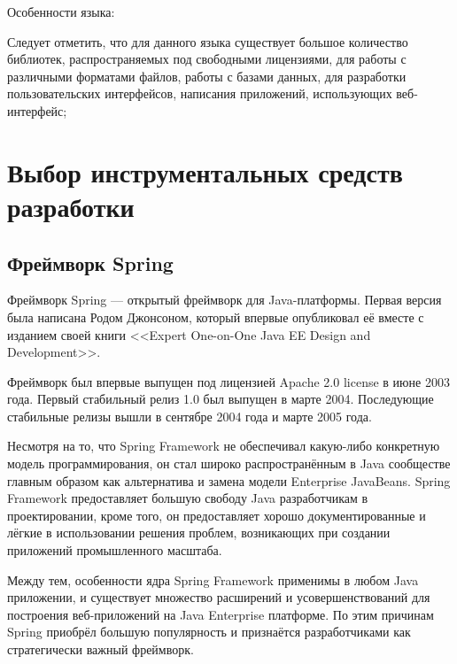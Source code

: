 \documentclass[14pt,a4paper]{reportmod}
\begin{document}
Особенности языка:
\begin{gostitemize}
\end{gostitemize}


Следует отметить, что для данного языка существует большое количество библиотек, распространяемых под свободными лицензиями, для работы с различными форматами файлов, работы с базами данных, для разработки пользовательских интерфейсов, написания приложений, использующих веб-интерфейс;

\section{Выбор инструментальных средств разработки}

\subsection{Фреймворк Spring}
Фреймворк Spring --- открытый фреймворк для Java-платформы. Первая версия была написана Родом Джонсоном, который впервые опубликовал её вместе с изданием своей книги <<Expert One-on-One Java EE Design and Development>>.


Фреймворк был впервые выпущен под лицензией Apache 2.0 license в июне 2003 года. Первый стабильный релиз 1.0 был выпущен в марте 2004. Последующие стабильные релизы вышли в сентябре 2004 года и марте 2005 года.


Несмотря на то, что Spring Framework не обеспечивал какую-либо конкретную модель программирования, он стал широко распространённым в Java сообществе главным образом как альтернатива и замена модели Enterprise JavaBeans. Spring Framework предоставляет большую свободу Java разработчикам в проектировании, кроме того, он предоставляет хорошо документированные и лёгкие в использовании решения проблем, возникающих при создании приложений промышленного масштаба.


Между тем, особенности ядра Spring Framework применимы в любом Java приложении, и существует множество расширений и усовершенствований для построения веб-приложений на Java Enterprise платформе. По этим причинам Spring приобрёл большую популярность и признаётся разработчиками как стратегически важный фреймворк\cite{refspringsource}.
\end{document}
